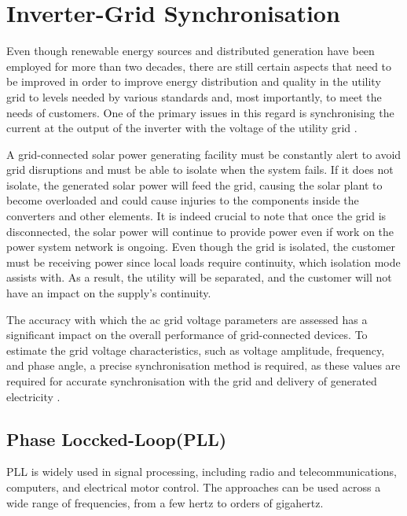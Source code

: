\documentclass[a4paper,12pt]{iitmdiss}
\begin{document}


\chapter{Inverter-Grid Synchronisation}\label{chap:Inverter-Grid Synchronisation}

Even though renewable energy sources and distributed generation have been employed for more than two decades, there are still certain aspects that need to be improved in order to improve energy distribution and quality in the utility grid to levels needed by various standards and, most importantly, to meet the needs of customers. One of the primary issues in this regard is synchronising the current at the output of the inverter with the voltage of the utility grid \cite{rocabert2012control}.

A grid-connected solar power generating facility must be constantly alert to avoid grid disruptions and must be able to isolate when the system fails. If it does not isolate, the generated solar power will feed the grid, causing the solar plant to become overloaded and could cause injuries to the components inside the converters and other elements.
It is indeed crucial to note that once the grid is disconnected, the solar power will continue to provide power even if work on the power system network is ongoing. 
Even though the grid is isolated, the customer must be receiving power since local loads require continuity, which isolation mode assists with.
As a result, the utility will be separated, and the customer will not have an impact on the supply's continuity. 

The accuracy with which the ac grid voltage parameters are assessed has a significant impact on the overall performance of grid-connected devices. To estimate the grid voltage characteristics, such as voltage amplitude, frequency, and phase angle, a precise synchronisation method is required, as these values are required for accurate synchronisation with the grid and delivery of generated electricity \cite{rocabert2012control}.

\section{Phase Loccked-Loop(PLL)}

 PLL is widely used in signal processing, including radio and telecommunications, computers, and electrical motor control. The approaches can be used across a wide range of frequencies, from a few hertz to orders of gigahertz. 
\end{document}
